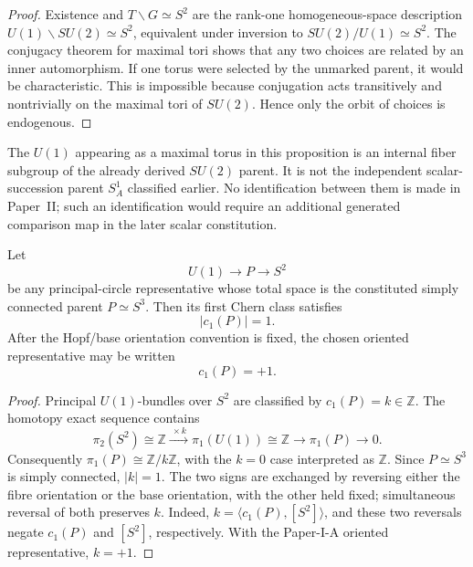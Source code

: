 \documentclass[12pt,a4paper]{article}
\begin{document}
\begin{proof}
Existence and \(T\backslash G\simeq S^2\) are the rank-one homogeneous-space
description \(U(1)\backslash SU(2)\simeq S^2\), equivalent under inversion to
\(SU(2)/U(1)\simeq S^2\).  The conjugacy theorem for maximal tori
shows that any two choices are related by an inner automorphism.  If one torus
were selected by the unmarked parent, it would be characteristic.  This is
impossible because conjugation acts transitively and nontrivially on the
maximal tori of \(SU(2)\).  Hence only the orbit of choices is endogenous.
\end{proof}

\begin{remark}
\label{p2:rem:hopf-fiber-versus-scalar-parent}
The \(U(1)\) appearing as a maximal torus in this proposition is an internal
fiber subgroup of the already derived \(SU(2)\) parent.  It is not the
independent scalar-succession parent \(S^1_A\) classified earlier.  No
identification between them is made in Paper~II; such an identification would
require an additional generated comparison map in the later scalar
constitution.
\end{remark}

\begin{theorem}
\label{p2:thm:forced-hopf-chern-unit}
Let
\[
        U(1)\longrightarrow P\longrightarrow S^2
\]
be any principal-circle representative whose total space is the constituted
simply connected parent \(P\simeq S^3\).  Then its first Chern class satisfies
\[
|c_1(P)|=1.
\]
After the Hopf/base orientation convention is fixed, the chosen oriented
representative may be written
\[
c_1(P)=+1.
\]
\end{theorem}

\begin{proof}
Principal \(U(1)\)-bundles over \(S^2\) are classified by
\(c_1(P)=k\in\mathbb Z\).  The homotopy exact sequence contains
\[
 \pi_2(S^2)\cong\mathbb Z
 \xrightarrow{\ \times k\ }
 \pi_1(U(1))\cong\mathbb Z
 \longrightarrow\pi_1(P)\longrightarrow0.
\]
Consequently \(\pi_1(P)\cong\mathbb Z/k\mathbb Z\), with the \(k=0\)
case interpreted as \(\mathbb Z\).  Since \(P\simeq S^3\) is simply
connected, \(|k|=1\).  The two signs are exchanged by reversing either the fibre orientation or
the base orientation, with the other held fixed; simultaneous reversal of
both preserves \(k\).  Indeed,
\(k=\langle c_1(P),[S^2]\rangle\), and these two reversals negate
\(c_1(P)\) and \([S^2]\), respectively.  With the Paper-I-A oriented
representative, \(k=+1\).
\end{proof}
\end{document}
